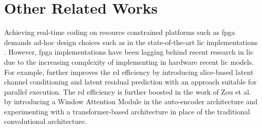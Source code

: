 \section{Other Related Works}
Achieving real-time coding on resource constrained platforms such as \acrfull{fpga} demands ad-hoc design choices such as in the state-of-the-art \acrshort{lic} implementations \cite{9745965, 10494759}. However, \acrshort{fpga} implementations have been lagging behind recent research in \acrshort{lic} due to the increasing complexity of implementing in hardware recent \acrshort{lic} models. For example, \cite{minnen2020channelwiseautoregressiveentropymodels} further improves the \acrshort{rd} efficiency by introducing slice-based latent channel conditioning and latent residual prediction with an approach suitable for parallel execution. The \acrshort{rd} efficiency is further boosted in the work of Zou et al. \cite{zou2022devildetailswindowbasedattention} by introducing a Window Attention Module in the auto-encoder architecture and experimenting with a transformer-based architecture in place of the traditional convolutional architecture.